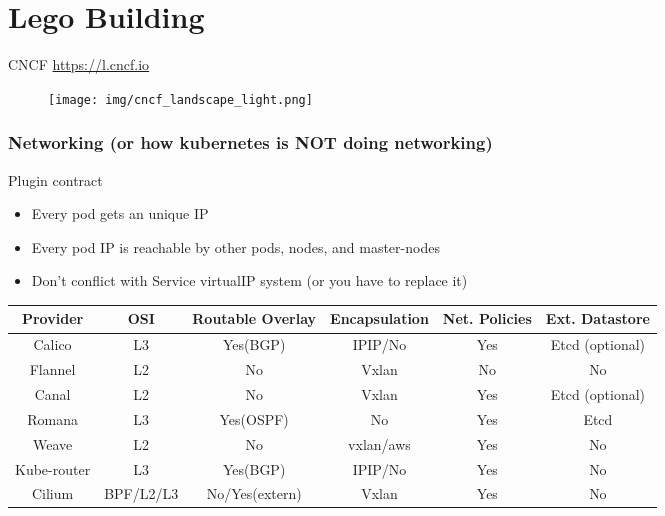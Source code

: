 \documentclass{beamer}
\begin{document}
\section{Lego Building}

\begin{frame}{CNCF \textendash \href{https://l.cncf.io}{https://l.cncf.io}}
  \begin{figure}
        \begin{center}
            \texttt{[image: img/cncf\_landscape\_light.png]}
        \end{center}
    \end{figure}
\end{frame}

\begin{frame}[fragile]
  \frametitle{Networking \footnotesize{(or how kubernetes is NOT doing networking)}}
  \begin{block}{Plugin contract}
    \begin{itemize}
      \item Every pod gets an unique IP
      \item Every pod IP is reachable by other pods, nodes, and master-nodes
      \item Don't conflict with Service virtualIP system (or you have to replace it)
    \end{itemize}
  \end{block}
  \scriptsize{
    \begin{table}
      \begin{tabular}{|c|c|c|c|c|c|} \hline
Provider    & OSI       & \tiny{Routable Overlay} & \tiny{Encapsulation} & \tiny{Net. Policies} & Ext. Datastore \\ \hline
Calico      & L3        & Yes(BGP)         & IPIP/No       & Yes              & Etcd (optional) \\ \hline
Flannel     & L2        & No               & Vxlan         & No               & No              \\ \hline
Canal       & L2        & No               & Vxlan         & Yes              & Etcd (optional) \\ \hline
Romana      & L3        & Yes(OSPF)        & No            & Yes              & Etcd            \\ \hline
Weave       & L2        & No               & vxlan/aws     & Yes              & No              \\ \hline
Kube-router & L3        & Yes(BGP)         & IPIP/No       & Yes              & No              \\ \hline
Cilium      & BPF/L2/L3 & No/Yes(extern)   & Vxlan         & Yes              & No              \\ \hline
      \end{tabular}
    \end{table}
}
\end{frame}
\end{document}
